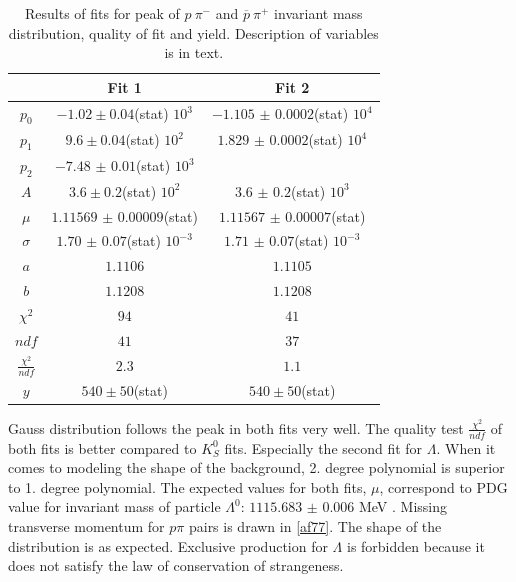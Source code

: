 \begin{table}[ht]
        \centering
        \begin{tabular}{c|c|c}
             & Fit 1 & Fit 2 \\ \hline
           $p_0$ & $-1.02 \pm 0.04$(stat) $10^{3}$ & $-1.105$ $ \pm$ $ 0.0002$(stat) $10^{4}$ \\ \hline
           $p_1$ & $9.6 \pm 0.04$(stat) $10^2$ &  $1.829$ $ \pm$ $ 0.0002$(stat) $10^4$  \\ \hline
           $p_2$ & $-7.48$ $ \pm$ $ 0.01$(stat) $10^3$ \\ \hline
           $A$ & $3.6 \pm 0.2$(stat) $10^2$ & $3.6$ $ \pm$ $ 0.2$(stat) $10^3$ \\ \hline
           $\mu$ & $1.11569$ $ \pm$ $ 0.00009$(stat) & $1.11567$ $\pm$ $ 0.00007$(stat)  \\ \hline
           $\sigma$ & $1.70$ $ \pm$ $ 0.07$(stat) $10^{-3}$ &  $1.71$ $ \pm$ $ 0.07$(stat) $10^{-3}$\\ \hline
           $a$ & $1.1106$ & $1.1105$\\ \hline
           $b$ & $1.1208$ &$1.1208$ \\ \hline
           $\chi^2$ & $94$ & $41$\\ \hline
           $ndf$ & $41$  &  $37$\\ \hline
           $\frac{\chi^2}{ndf}$ & $2.3$ & $1.1$ \\ \hline
           $y$ & $540 \pm 50$(stat) & $540 \pm 50$(stat)
        \end{tabular}
    \caption[Results for fit 1 and 2 of invariant mass of $p \pi$ pairs.]{Results of fits for peak of $p ~\pi^- $ and $\overline{p}~\pi^+$ invariant mass distribution, quality of fit and yield. Description of variables is in text. }
    \label{at3}
\end{table}
\FloatBarrier
Gauss distribution follows the peak in both fits very well. The quality test $\frac{\chi^2}{ndf}$ of both fits is better compared to $K^0_S$ fits. Especially the second fit for $\Lambda$. When it comes to modeling the shape of the background, 2. degree polynomial is superior to 1. degree polynomial. The expected values for both fits, $\mu$, correspond to PDG value for invariant mass of particle $\Lambda^0$: $1115.683$ $\pm$ $0.006$ MeV \cite{zyla}.
\newline
Missing transverse momentum for $p \pi$ pairs is drawn in \autoref{af77}. The shape of the distribution is as expected. Exclusive production for $\Lambda$ is forbidden because it does not satisfy the law of conservation of strangeness.
